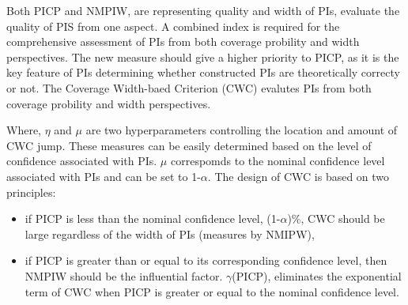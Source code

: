 \documentclass[review]{elsarticle}
\begin{document}
        Both PICP and NMPIW, are representing quality and width of PIs, evaluate the quality of PIS from one aspect. A combined index is required for the comprehensive assessment of PIs from both coverage probility and width perspectives. The new measure should give a higher priority to PICP, as it is the key feature of PIs determining whether constructed PIs are theoretically correcty or not. The Coverage Width-baed Criterion (CWC) evalutes PIs from both coverage probility and width perspectives.

        Where, $\eta$ and $\mu$ are two hyperparameters controlling the location and amount of CWC jump. These measures can be easily determined based on the level of confidence associated with PIs. $\mu$ correspomds to the nominal confidence level associated with PIs and can be set to 1-$\alpha$. The design of CWC is based on two principles:

        \begin{itemize}
          \item if PICP is less than the nominal confidence level, (1-$\alpha$)$\%$, CWC should be large regardless of the width of PIs (measures by NMIPW),
          \item if PICP is greater than or equal to its corresponding confidence level, then NMPIW should be the influential factor. $\gamma$(PICP), eliminates the exponential term of CWC when PICP is greater or equal to the nominal confidence level.
        \end{itemize}
\end{document}
